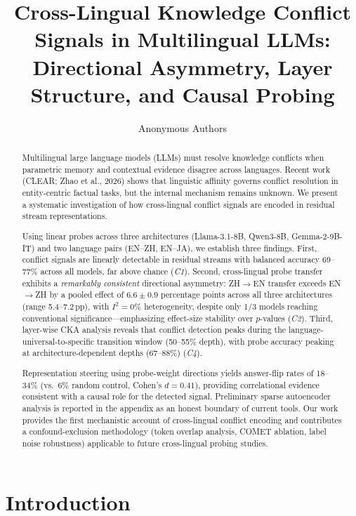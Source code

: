 \documentclass{article}
\title{Cross-Lingual Knowledge Conflict Signals in Multilingual LLMs:\\Directional Asymmetry, Layer Structure, and Causal Probing}
\author{
  Anonymous Authors
}
\date{}
\begin{document}
\maketitle

\begin{abstract}
Multilingual large language models (LLMs) must resolve knowledge conflicts when parametric memory and contextual evidence disagree across languages. Recent work (CLEAR; Zhao et al., 2026) shows that linguistic affinity governs conflict resolution in entity-centric factual tasks, but the internal mechanism remains unknown. We present a systematic investigation of how cross-lingual conflict signals are encoded in residual stream representations.

Using linear probes across three architectures (Llama-3.1-8B, Qwen3-8B, Gemma-2-9B-IT) and two language pairs (EN--ZH, EN--JA), we establish three findings.
First, conflict signals are linearly detectable in residual streams with balanced accuracy 69--77\% across all models, far above chance (\emph{C1}).
Second, cross-lingual probe transfer exhibits a \emph{remarkably consistent} directional asymmetry: ZH$\to$EN transfer exceeds EN$\to$ZH by a pooled effect of $6.6 \pm 0.9$ percentage points across all three architectures (range 5.4--7.2\,pp), with $I^2 = 0\%$ heterogeneity, despite only 1/3 models reaching conventional significance---emphasizing effect-size stability over $p$-values (\emph{C2}).
Third, layer-wise CKA analysis reveals that conflict detection peaks during the language-universal-to-specific transition window (50--55\% depth), with probe accuracy peaking at architecture-dependent depths (67--88\%) (\emph{C4}).

Representation steering using probe-weight directions yields answer-flip rates of 18--34\% (vs.\ 6\% random control, Cohen's $d = 0.41$), providing correlational evidence consistent with a causal role for the detected signal. Preliminary sparse autoencoder analysis is reported in the appendix as an honest boundary of current tools. Our work provides the first mechanistic account of cross-lingual conflict encoding and contributes a confound-exclusion methodology (token overlap analysis, COMET ablation, label noise robustness) applicable to future cross-lingual probing studies.
\end{abstract}

\section{Introduction}
\end{document}
